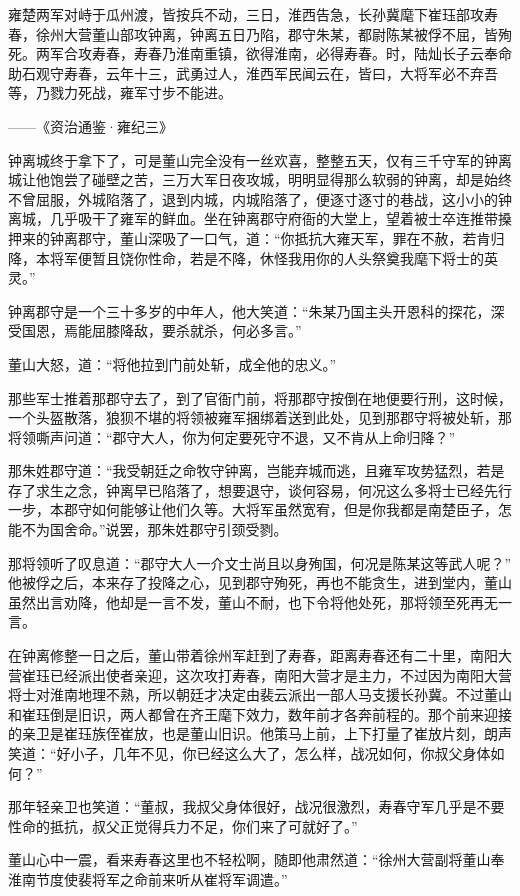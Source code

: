 雍楚两军对峙于瓜州渡，皆按兵不动，三日，淮西告急，长孙冀麾下崔珏部攻寿春，徐州大营董山部攻钟离，钟离五日乃陷，郡守朱某，都尉陈某被俘不屈，皆殉死。两军合攻寿春，寿春乃淮南重镇，欲得淮南，必得寿春。时，陆灿长子云奉命助石观守寿春，云年十三，武勇过人，淮西军民闻云在，皆曰，大将军必不弃吾等，乃戮力死战，雍军寸步不能进。

——《资治通鉴·雍纪三》

钟离城终于拿下了，可是董山完全没有一丝欢喜，整整五天，仅有三千守军的钟离城让他饱尝了碰壁之苦，三万大军日夜攻城，明明显得那么软弱的钟离，却是始终不曾屈服，外城陷落了，退到内城，内城陷落了，便逐寸逐寸的巷战，这小小的钟离城，几乎吸干了雍军的鲜血。坐在钟离郡守府衙的大堂上，望着被士卒连推带搡押来的钟离郡守，董山深吸了一口气，道：“你抵抗大雍天军，罪在不赦，若肯归降，本将军便暂且饶你性命，若是不降，休怪我用你的人头祭奠我麾下将士的英灵。”

钟离郡守是一个三十多岁的中年人，他大笑道：“朱某乃国主头开恩科的探花，深受国恩，焉能屈膝降敌，要杀就杀，何必多言。”

董山大怒，道：“将他拉到门前处斩，成全他的忠义。”

那些军士推着那郡守去了，到了官衙门前，将那郡守按倒在地便要行刑，这时候，一个头盔散落，狼狈不堪的将领被雍军捆绑着送到此处，见到那郡守将被处斩，那将领嘶声问道：“郡守大人，你为何定要死守不退，又不肯从上命归降？”

那朱姓郡守道：“我受朝廷之命牧守钟离，岂能弃城而逃，且雍军攻势猛烈，若是存了求生之念，钟离早已陷落了，想要退守，谈何容易，何况这么多将士已经先行一步，本郡守如何能够让他们久等。大将军虽然宽宥，但是你我都是南楚臣子，怎能不为国舍命。”说罢，那朱姓郡守引颈受剹。

那将领听了叹息道：“郡守大人一介文士尚且以身殉国，何况是陈某这等武人呢？” 他被俘之后，本来存了投降之心，见到郡守殉死，再也不能贪生，进到堂内，董山虽然出言劝降，他却是一言不发，董山不耐，也下令将他处死，那将领至死再无一言。

在钟离修整一日之后，董山带着徐州军赶到了寿春，距离寿春还有二十里，南阳大营崔珏已经派出使者亲迎，这次攻打寿春，南阳大营才是主力，不过因为南阳大营将士对淮南地理不熟，所以朝廷才决定由裴云派出一部人马支援长孙冀。不过董山和崔珏倒是旧识，两人都曾在齐王麾下效力，数年前才各奔前程的。那个前来迎接的亲卫是崔珏族侄崔放，也是董山旧识。他策马上前，上下打量了崔放片刻，朗声笑道：“好小子，几年不见，你已经这么大了，怎么样，战况如何，你叔父身体如何？”

那年轻亲卫也笑道：“董叔，我叔父身体很好，战况很激烈，寿春守军几乎是不要性命的抵抗，叔父正觉得兵力不足，你们来了可就好了。”

董山心中一震，看来寿春这里也不轻松啊，随即他肃然道：“徐州大营副将董山奉淮南节度使裴将军之命前来听从崔将军调遣。”

